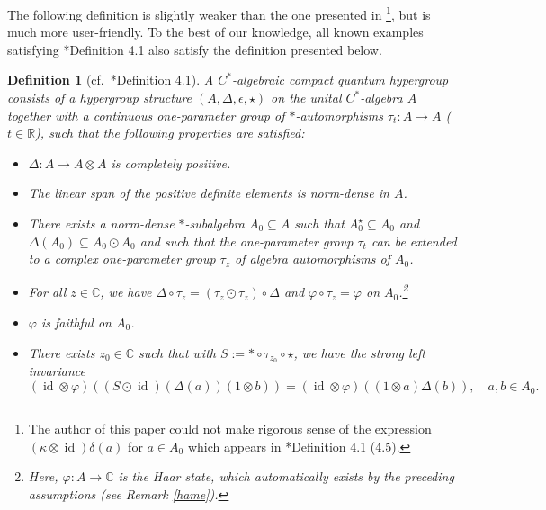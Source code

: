 \documentclass[reqno]{amsart}
\numberwithin{equation}{section}
\newtheorem{Def}[Theorem]{Definition}
\DeclareMathOperator{\id}{\mathrm{id}}
\newcommand{\C}{\mathbb{C}}
\newcommand{\R}{\mathbb{R}}
\begin{document}
The following definition is slightly weaker than the one presented in \cite{CV99}\footnote{The author of this paper could not make rigorous sense of the expression $(\kappa\otimes  \id)\delta(a)$ for $a\in A_0$ which appears in \cite{CV99}*{Definition 4.1 (4.5)}.}, but is much more user-friendly. To the best of our knowledge, all known examples satisfying \cite{CV99}*{Definition 4.1} also satisfy the definition presented below.

\begin{Def}[cf.\ \cite{CV99}*{Definition 4.1}]\label{complicated}
    A $C^*$-algebraic compact quantum hypergroup consists of a hypergroup structure $(A, \Delta, \epsilon,\star)$ on the unital $C^*$-algebra $A$ together with a continuous one-parameter group of $*$-automorphisms $\tau_t: A\to A$ ($t\in \R$), such that the following properties are satisfied:
    \begin{itemize}
        \item $\Delta: A\to A\otimes A$ is completely positive.
        \vspace{-1.5mm}\item The linear span of the positive definite elements is norm-dense in $A$.
        \vspace{-1.5mm}\item There exists a norm-dense $*$-subalgebra $A_0\subseteq A$  such that $A_0^\star\subseteq A_0$ and $\Delta(A_0)\subseteq A_0\odot A_0$ and such that the one-parameter group $\tau_t$ can be extended to a complex one-parameter group $\tau_z$ of algebra automorphisms of $A_0$.
       \vspace{-1.5mm} \item For all $z\in \C$, we have $\Delta\circ \tau_z= (\tau_z\odot\tau_z)\circ \Delta$ and $\varphi\circ \tau_z=\varphi$ on $A_0$.\footnote{Here, $\varphi: A\to \C$ is the Haar state, which automatically exists by the preceding assumptions (see Remark \ref{hame}).}
        \vspace{-1.5mm}\item $\varphi$ is faithful on $A_0$.
        \vspace{-1.5mm}\item There exists $z_0\in \C$ such that with $S:= *\circ \tau_{z_0}\circ \star$, we have the strong left invariance
        $$(\id \otimes \varphi)((S\odot \id)(\Delta(a))(1\otimes b)) = (\id \otimes \varphi)((1\otimes a)\Delta(b)),\quad a,b\in A_0.$$
    \end{itemize}
\end{Def}
\end{document}
